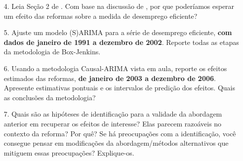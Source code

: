 \documentclass[12pt,a4paper]{article}
\begin{document}
		\begin{enumerate}
	\item[4.] Leia Seção 2 de \citet{Bradley2019}. Com base na discussão de \citet{michaillat2022u}, por que poderíamos esperar um efeito das reformas sobre a medida de desemprego eficiente?
	
	\item[5.] Ajuste um modelo (S)ARIMA para a série de desemprego eficiente, \textbf{com dados de janeiro de 1991 a dezembro de 2002}. Reporte todas as etapas da metodologia de Box-Jenkins.
	
	\item[6.] Usando a metodologia Causal-ARIMA vista em aula, reporte os efeitos estimados das reformas, \textbf{de janeiro de 2003 a dezembro de 2006}. Apresente estimativas pontuais e os intervalos de predição dos efeitos. Quais as conclusões da metodologia?
	
	\item[7.] Quais são as hipóteses de identificação para a validade da abordagem anterior em recuperar os efeitos de interesse? Elas parecem razoáveis no contexto da reforma? Por quê? Se há preocupações com a identificação, você consegue pensar em modificações da abordagem/métodos alternativos que mitiguem essas preocupações? Explique-os.
	
	
	
\end{enumerate}
\printbibliography
\end{document}

